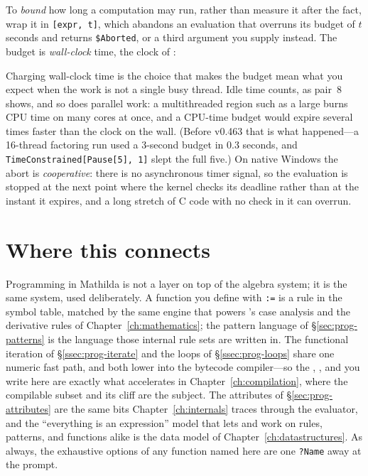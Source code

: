 To \emph{bound} how long a computation may run, rather than measure it after the
fact, wrap it in \texttt{[expr, t]}, which abandons an evaluation
that overruns its budget of \(t\) seconds and returns \texttt{\$Aborted}, or a third
argument you supply instead. The budget is \emph{wall-clock} time, the clock of
:

\begin{codepairs}
\end{codepairs}

Charging wall-clock time is the choice that makes the budget mean what you expect
when the work is not a single busy thread. Idle time counts, as pair~8 shows, and so
does parallel work: a multithreaded region such as a large  burns
CPU time on many cores at once, and a CPU-time budget would expire several times
faster than the clock on the wall. (Before v0.463 that is what happened---a 16-thread
factoring run used a 3-second budget in 0.3 seconds, and
\texttt{TimeConstrained[Pause[5], 1]} slept the full five.) On native Windows the
abort is \emph{cooperative}: there is no asynchronous timer signal, so the
evaluation is stopped at the next point where the kernel checks its deadline rather
than at the instant it expires, and a long stretch of C code with no check in it can
overrun.

\section*{Where this connects}

Programming in Mathilda is not a layer on top of the algebra system; it is the
same system, used deliberately. A function you define with \texttt{:=} is a rule
in the symbol table, matched by the same engine that powers 's
case analysis and the derivative rules of Chapter~\ref{ch:mathematics}; the
pattern language of \S\ref{sec:prog-patterns} is the language those internal rule
sets are written in. The functional iteration of \S\ref{ssec:prog-iterate} and the
loops of \S\ref{ssec:prog-loops} share one numeric fast path, and both lower into
the bytecode compiler---so the , , and  you write here are
exactly what  accelerates in Chapter~\ref{ch:compilation}, where the
compilable subset and its cliff are the subject. The attributes of
\S\ref{sec:prog-attributes} are the same bits Chapter~\ref{ch:internals} traces
through the evaluator, and the ``everything is an expression'' model that lets
 and  work on rules, patterns, and functions alike is the
data model of Chapter~\ref{ch:datastructures}. As always, the exhaustive options
of any function named here are one \texttt{?Name} away at the prompt.
